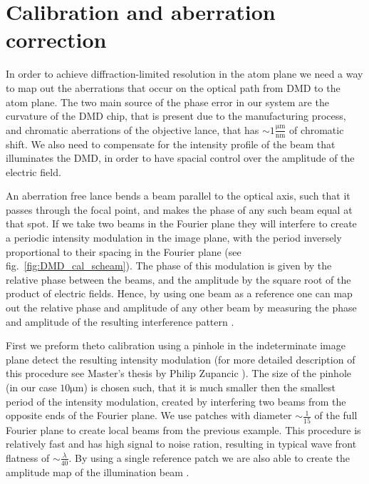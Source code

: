 \section{Calibration and aberration correction}
In order to achieve diffraction-limited resolution in the atom plane we need a way to map out the aberrations that occur on the optical path from DMD to the atom plane. The two main source of the phase error in our system are the curvature of the DMD chip, that is present due to the manufacturing process, and chromatic aberrations of the objective lance, that has $\sim 1 \frac{\mathrm{\mu m}}{\mathrm{nm}} $ of chromatic shift. We also need to compensate for the intensity profile of the beam that illuminates the DMD, in order to have spacial control over the amplitude of the electric field.

An aberration free lance bends a beam parallel to the optical axis, such that it passes through the focal point, and makes the phase of any such beam equal at that spot. If we take two beams in the Fourier plane they will interfere to create a periodic intensity modulation in the image plane, with the period inversely proportional to their spacing in the Fourier plane (see fig.~\ref{fig:DMD_cal_scheam}). The phase of this modulation is given by the relative phase between the beams, and the amplitude by the square root of the product of electric fields. Hence, by using one beam as a reference one can map out the relative phase and amplitude of any other beam by measuring the phase and amplitude of the resulting interference pattern \cite{Zupancic2016}.

First we preform theto calibration using a pinhole in the indeterminate image plane  detect the resulting intensity modulation (for more detailed description of this procedure see Master’s thesis by Philip Zupancic \cite{Zupancic thesis}). The size of the pinhole (in our case $10 \mathrm{\mu m}$) is chosen such, that it is much smaller then the smallest period of the intensity modulation, created by interfering two beams from the opposite ends of the Fourier plane. We use patches with diameter $\sim \frac{1}{15}$ of the full Fourier plane to create local beams from the previous example. This procedure is relatively fast and has high signal to noise ration, resulting in typical wave front flatness of $\sim \frac{\lambda}{40}$. By using a single reference patch we are also able to create the amplitude map of the illumination beam \cite{Zupancic2016}.  

